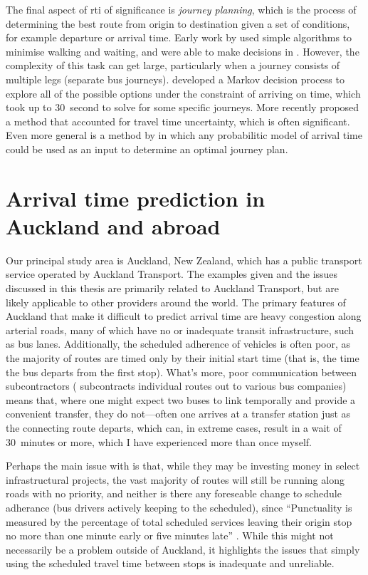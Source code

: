 The final aspect of \gls{rti} of significance is \emph{journey planning}, which is the process of determining the best route from origin to destination given a set of conditions, for example departure or arrival time. Early work by \citet{Horn_2004} used simple algorithms to minimise walking and waiting, and were able to make decisions in \rt{}. However, the complexity of this task can get large, particularly when a journey consists of multiple legs (separate bus journeys). \citet{Hame_2013a} developed a Markov decision process to explore all of the possible options under the constraint of arriving on time, which took up to 30~second to solve for some specific journeys. More recently \citet{Zheng_2016} proposed a method that accounted for travel time uncertainty, which is often significant. Even more general is a method by \citet{Berczi_2017} in which any probabilitic model of arrival time could be used as an input to determine an optimal journey plan.




\section{Arrival time prediction in Auckland and abroad}
\label{sec:auckland_etas}

Our principal study area is Auckland, New Zealand, which has a public transport service operated by Auckland Transport. The examples given and the issues discussed in this thesis are primarily related to Auckland Transport, but are  likely applicable to other providers around the world. The primary features of Auckland that make it difficult to predict arrival time are heavy congestion along arterial roads, many of which have no or inadequate transit infrastructure, such as bus lanes. Additionally, the scheduled adherence of vehicles is often poor, as the majority of routes are timed only by their initial start time (that is, the time the bus departs from the first stop). What's more, poor communication between subcontractors (\AT{} subcontracts individual routes out to various bus companies) means that, where one might expect two buses to link temporally and provide a convenient transfer, they do not---often one arrives at a transfer station just as the connecting route departs, which can, in extreme cases, result in a wait of 30~minutes or more, which I have experienced more than once myself.


Perhaps the main issue with \AT{} is that, while they may be investing money in select infrastructural projects, the vast majority of routes will still be running along roads with no priority, and neither is there any foreseable change to schedule adherance (bus drivers actively keeping to the scheduled), since ``Punctuality is measured by the percentage of total scheduled services leaving their origin stop no more than one minute early or five minutes late'' \citep[13]{AT_report_2019}. While this might not necessarily be a problem outside of Auckland, it highlights the issues that simply using the scheduled travel time between stops is inadequate and unreliable.


